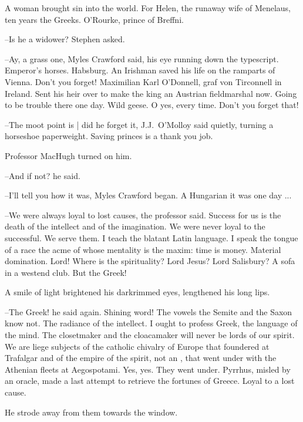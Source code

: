 A woman brought sin into the world.
For Helen,
the runaway wife of Menelaus,
ten years the Greeks.
O'Rourke,
prince of Breffni.

--Is he a widower?
Stephen asked.

--Ay, a grass one,
Myles Crawford said,
his eye running down the typescript.
Emperor's horses.
Habsburg.
An Irishman saved his life on the ramparts of Vienna.
Don't you forget!
Maximilian Karl O'Donnell,
graf von Tirconnell in Ireland.
Sent his heir over to make the king an Austrian fieldmarshal now.
Going to be trouble there one day.
Wild geese.
O yes, every time.
Don't you forget that!

--The moot point is |
did he forget it,
J.J.~O'Molloy said quietly,
turning a horseshoe paperweight.
Saving princes is a thank you job.

Professor MacHugh turned on him.

--And if not?
he said.

--I'll tell you how it was,
Myles Crawford began.
A Hungarian it was one day ...



--We were always loyal to lost causes,
the professor said.
Success for us is the death of the intellect and of the imagination.
We were never loyal to the successful.
We serve them.
I teach the blatant Latin language.
I speak the tongue of a race the acme of whose mentality is the maxim:
time is money.
Material domination.
Lord!
Where is the spirituality?
Lord Jesus?
Lord Salisbury?
A sofa in a westend club.
But the Greek!



A smile of light brightened his darkrimmed eyes,
lengthened his long lips.

--The Greek!
he said again.
Shining word!
The vowels the Semite and the Saxon know not.
The radiance of the intellect.
I ought to profess Greek, the language of the mind.
The closetmaker and the cloacamaker will never be lords of our spirit.
We are liege subjects of the catholic chivalry of Europe that foundered at Trafalgar
and of the empire of the spirit,
not an ,
that went under with the Athenian fleets at Aegospotami.
Yes, yes.
They went under.
Pyrrhus,
misled by an oracle,
made a last attempt to retrieve the fortunes of Greece.
Loyal to a lost cause.

He strode away from them towards the window.


